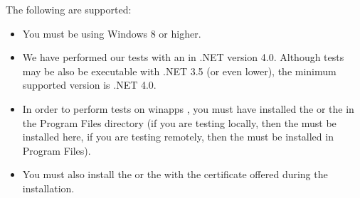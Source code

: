 The  following \gdauts{} are supported:

\begin{itemize}
\item You must be using Windows 8 or higher. 
\item We have performed our tests with an  \gdaut{} in .NET version 4.0. Although tests may be also be executable with .NET 3.5 (or even lower), the minimum supported version is .NET 4.0.
\item In order to perform tests on winapps \gdauts{}, you must have installed the \ite{} or the \gdagent{} in the Program Files directory (if you are testing locally, then the \ite{} must be installed here, if you are testing remotely, then the \gdagent{} must be installed in Program Files). 
\item You must also install the \ite{} or the \gdagent{} with the certificate offered during the installation. 
\end{itemize}



